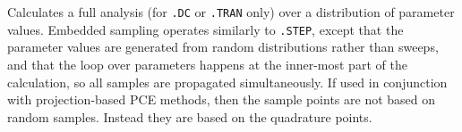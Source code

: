 

\label{EMBEDDEDSAMPLING_section}
 
Calculates a full analysis (for \verb|.DC| or \verb|.TRAN| only) over
a distribution of parameter values.  Embedded sampling operates
similarly to \verb|.STEP|, except that the parameter values are
generated from random distributions rather than sweeps, and that the 
loop over parameters happens at the inner-most part of the calculation, 
so all samples are propagated simultaneously.
If used in conjunction 
with projection-based PCE methods, then the sample points are not based on random samples.  
Instead they are based on the quadrature points.



